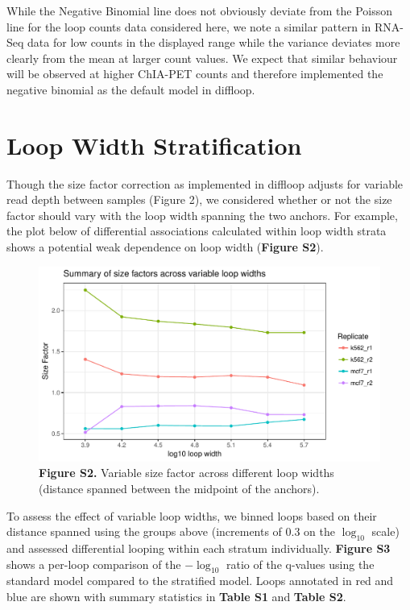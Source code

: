 \documentclass{article}\usepackage[]{graphicx}\usepackage[]{color}
\makeatletter
\def\maxwidth{ %
  \ifdim\Gin@nat@width>\linewidth
    \linewidth
  \else
    \Gin@nat@width
  \fi
}
\newenvironment{knitrout}{}{} %
\makeatother
\begin{document}
While the Negative Binomial line does not obviously deviate from the Poisson line for the loop counts data considered here, we note a similar pattern in RNA-Seq data for low counts in the displayed range while the variance deviates more clearly from the mean at larger count values. We expect that similar behaviour will be observed at higher ChIA-PET counts and therefore implemented the negative binomial as the default model in diffloop. 


\section*{Loop Width Stratification}
Though the size factor correction as implemented in diffloop adjusts for variable read depth between samples (Figure 2), we considered whether or not the size factor should vary with the loop width spanning the two anchors. For example, the plot below of differential associations calculated within loop width strata shows a potential weak dependence on loop width (\textbf{Figure S2}). 

\begin{figure}[h]
\begin{knitrout}
\color{fgcolor}

{\centering \includegraphics[width=\maxwidth]{figure/linePlot-1} 

}



\end{knitrout}
\centering
\caption{\textbf{Figure S2.} Variable size factor across different loop widths (distance spanned between the midpoint of the anchors).}
\end{figure}

To assess the effect of variable loop widths, we binned loops based on their distance spanned using the groups above (increments of 0.3 on the $\log_{10}$ scale) and assessed differential looping within each stratum individually. \textbf{Figure S3} shows a per-loop comparison of the $-\log_{10}$ ratio of the q-values using the standard model compared to the stratified model. Loops annotated in red and blue are shown with summary statistics in \textbf{Table S1} and \textbf{Table S2}.
\end{document}
